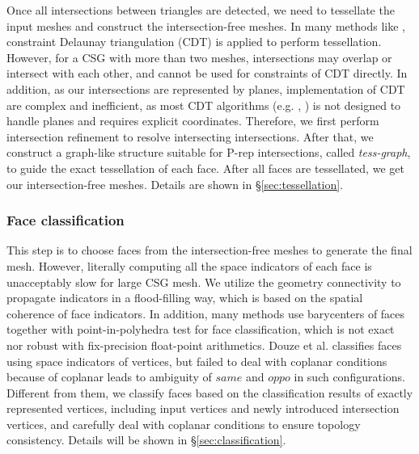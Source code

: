\documentclass[10pt,journal,compsoc]{IEEEtran}
\begin{document}
Once all intersections between triangles are detected, we need to tessellate the input meshes and construct the intersection-free meshes. In many methods like \cite{ogayar2015deferred}, constraint Delaunay triangulation (CDT) is applied to perform tessellation. However, for a CSG with more than two meshes, intersections may overlap or intersect with each other, and cannot be used for constraints of CDT directly. In addition, as our intersections are represented by planes, implementation of CDT are complex and inefficient, as most CDT algorithms (e.g. \cite{chew1989constrained}, \cite{de1992line}) is not designed to handle planes and requires explicit coordinates. Therefore, we first perform intersection refinement to resolve intersecting intersections. After that, we construct a graph-like structure suitable for P-rep intersections, called \emph{tess-graph}, to guide the exact tessellation of each face. After all faces are tessellated, we get our intersection-free meshes. Details are shown in \S\ref{sec:tessellation}.

\subsubsection{Face classification}

This step is to choose faces from the intersection-free meshes to generate the final mesh. However, literally computing all the space indicators of each face is unacceptably slow for large CSG mesh. We utilize the geometry connectivity to propagate indicators in a flood-filling way, which is based on the spatial coherence of face indicators. In addition, many methods use barycenters of faces together with point-in-polyhedra test for face classification, which is not exact nor robust with fix-precision float-point arithmetics. Douze et al. \cite{douze2015quickcsg} classifies faces using space indicators of vertices, but failed to deal with coplanar conditions because of coplanar leads to ambiguity of $same$ and $oppo$ in such configurations. Different from them, we classify faces based on the classification results of exactly represented vertices, including input vertices and newly introduced intersection vertices, and carefully deal with coplanar conditions to ensure topology consistency. Details will be shown in \S\ref{sec:classification}.
\end{document}
